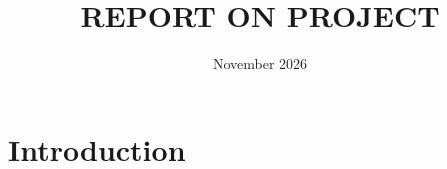 \documentclass{article}
\title{REPORT ON PROJECT}
\author{}
\date{November 2026}
\begin{document}
\maketitle

\section{Introduction}
\end{document}
